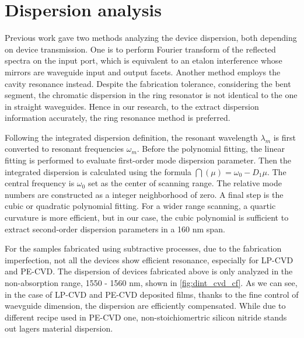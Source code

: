 \begin{figure}[t]
	\centering
	
	\label{fig:cvd_cf}
\end{figure}




\section{Dispersion analysis}

Previous work \cite{Sunada2018} gave two methods analyzing the device dispersion, both depending on device transmission. One is to perform Fourier transform of the reflected spectra on the input port, which is equivalent to an etalon interference whose mirrors are waveguide input and output facets. Another method employs the cavity resonance instead. Despite the fabrication tolerance, considering the bent segment, the chromatic dispersion in the ring resonator is not identical to the one in straight waveguides. Hence in our research, to the extract dispersion information accurately, the ring resonance method is preferred. 

Following the integrated dispersion definition, the resonant wavelength $\lambda_m$ is first converted to resonant frequencies $\omega_m$. Before the polynomial fitting, the linear fitting is performed to evaluate first-order mode dispersion parameter. Then the integrated dispersion is calculated using the formula $ \dint(\mu) = \omega_0 - D_1 \mu$. The central frequency is $\omega_0$ set as the center of scanning range. The relative mode numbers are constructed as a integer neighborhood of zero. A final step is the cubic or quadratic polynomial fitting. For a wider range scanning, a quartic curvature is more efficient, but in our case, the cubic polynomial is sufficient to extract second-order dispersion parameters in a 160 nm span.

For the samples fabricated using subtractive processes, due to the fabrication imperfection, not all the devices show efficient resonance, especially for LP-CVD and PE-CVD. The dispersion of devices fabricated above is only analyzed in the non-absorption range, 1550 - 1560 nm, shown in \autoref{fig:dint_cvd_cf}. As we can see, in the case of LP-CVD and PE-CVD deposited films, thanks to the fine control of waevguide dimension, the dispersion are efficiently compensated. While due to different recipe used in PE-CVD one, non-stoichiomertric silicon nitride stands out lagers material dispersion.

